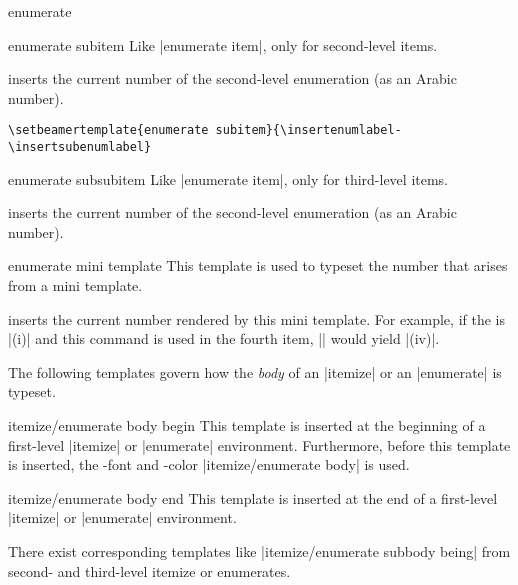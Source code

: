 \begin{environment}{{enumerate}}
  \begin{element}{enumerate subitem}\yes\yes\yes
    Like |enumerate item|, only for second-level items.

    \begin{templateinserts}
      \iteminsert{\insertsubenumlabel}
      inserts the current number of the second-level enumeration (as an
      Arabic number).
    \end{templateinserts}

    \example
\begin{verbatim}
\setbeamertemplate{enumerate subitem}{\insertenumlabel-\insertsubenumlabel}
\end{verbatim}
  \end{element}

  \begin{element}{enumerate subsubitem}\yes\yes\yes
    Like |enumerate item|, only for third-level items.

    \begin{templateinserts}
      \iteminsert{\insertsubsubenumlabel}
      inserts the current number of the second-level enumeration (as an
      Arabic number).
    \end{templateinserts}
  \end{element}

  \begin{element}{enumerate mini template}\yes\yes\yes
    This template is used to typeset the number that arises from a
    mini template.

    \begin{templateinserts}
      \iteminsert{\insertenumlabel}
      inserts the current number rendered by this mini template. For
      example, if the  is |(i)| and this command
      is used in the fourth item, |\insertenumlabel| would yield
      |(iv)|.
    \end{templateinserts}
  \end{element}
\end{environment}

The following templates govern how the \emph{body} of an |itemize| or
an |enumerate| is typeset.
\begin{element}{itemize/enumerate body begin}\yes\no\no
  This template is inserted at the beginning of a first-level
  |itemize| or |enumerate| environment. Furthermore, before this
  template is inserted, the \beamer-font and -color
  |itemize/enumerate body| is used.
\end{element}
\begin{element}{itemize/enumerate body end}\yes\no\no
  This template is inserted at the end of a first-level
  |itemize| or |enumerate| environment.
\end{element}
There exist corresponding templates like
|itemize/enumerate subbody being| from second- and third-level itemize
or enumerates.

